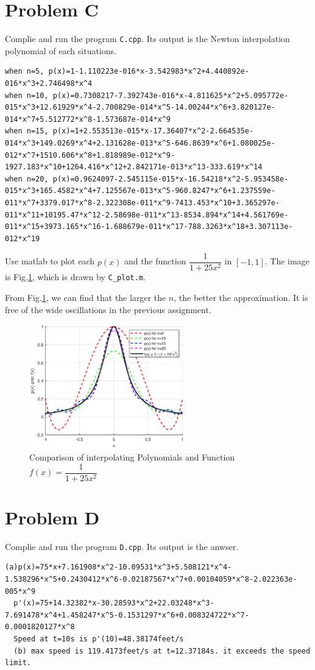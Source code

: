 \documentclass[a4paper]{article}
\begin{document}
\section*{Problem C}
Complie and run the program \verb|C.cpp|. Its output is the Newton interpolation polynomial of each situations.
\begin{lstlisting}[breaklines=true]
when n=5, p(x)=1-1.110223e-016*x-3.542983*x^2+4.440892e-016*x^3+2.746498*x^4
when n=10, p(x)=0.7308217-7.392743e-016*x-4.811625*x^2+5.095772e-015*x^3+12.61929*x^4-2.700829e-014*x^5-14.00244*x^6+3.820127e-014*x^7+5.512772*x^8-1.573687e-014*x^9
when n=15, p(x)=1+2.553513e-015*x-17.36407*x^2-2.664535e-014*x^3+149.0269*x^4+2.131628e-013*x^5-646.8639*x^6+1.080025e-012*x^7+1510.606*x^8+1.818989e-012*x^9-1927.183*x^10+1264.416*x^12+2.842171e-013*x^13-333.619*x^14
when n=20, p(x)=0.9624097-2.545115e-015*x-16.54218*x^2-5.953458e-015*x^3+165.4582*x^4+7.125567e-013*x^5-960.8247*x^6+1.237559e-011*x^7+3379.017*x^8-2.322308e-011*x^9-7413.453*x^10+3.365297e-011*x^11+10195.47*x^12-2.58698e-011*x^13-8534.894*x^14+4.561769e-011*x^15+3973.165*x^16-1.688679e-011*x^17-788.3263*x^18+3.307113e-012*x^19
\end{lstlisting}

Use matlab to plot each $p(x)$ and the function $\dfrac{1}{1+25x^2}$ in $[-1,1]$. The image is Fig.\ref{fig2}, which is drawn by \verb|C_plot.m|.

From Fig.\ref{fig2}, we can find that the larger the $n$, the better the approximation. It is free of the wide oscillations in the previous assignment.
\begin{figure}[htbp]
  \centering
  \includegraphics[width=0.6\textwidth]{images/C_pic.eps}  
  \renewcommand{\figurename}{Fig.}
  \caption{Comparison of interpolating Polynomials and Function $f(x)=\dfrac{1}{1+25x^2}$}
  \label{fig2}
\end{figure}

\section*{Problem D}
Complie and run the program \verb|D.cpp|. Its output is the anwser. 
\begin{lstlisting}[breaklines=true]
  (a)p(x)=75*x+7.161908*x^2-10.09531*x^3+5.508121*x^4-1.538296*x^5+0.2430412*x^6-0.02187567*x^7+0.00104059*x^8-2.022363e-005*x^9
  p'(x)=75+14.32382*x-30.28593*x^2+22.03248*x^3-7.691478*x^4+1.458247*x^5-0.1531297*x^6+0.008324722*x^7-0.0001820127*x^8
  Speed at t=10s is p'(10)=48.38174feet/s
  (b) max speed is 119.4173feet/s at t=12.37184s. it exceeds the speed limit.
  \end{lstlisting}
\end{document}
